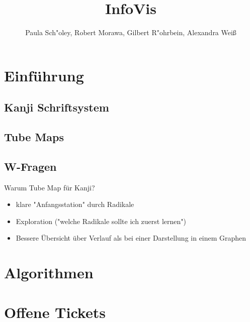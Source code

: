 \documentclass[color,german]{tudbook}
\begin{document}
\author{Paula Sch"oley, Robert Morawa, Gilbert R"ohrbein, Alexandra Wei\ss}
\title{InfoVis}
\fachrichtung{}

\maketitle

\tableofcontents 
\newpage

\section{Einführung}
\subsection{Kanji Schriftsystem}
\subsection{Tube Maps}
\subsection{W-Fragen}
Warum Tube Map für Kanji?
\begin{itemize}
\item klare "Anfangsstation" durch Radikale
\item Exploration ("welche Radikale sollte ich zuerst lernen")
\item Bessere Übersicht über Verlauf als bei einer Darstellung in einem Graphen
\end{itemize}

\section{Algorithmen}
\section{Offene Tickets}
\end{document}

